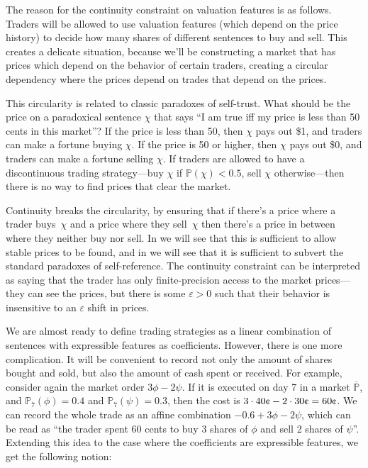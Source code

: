 \documentclass[authordate,onecolumn,noenvironments]{miri-tech-article}
\numberwithin{equation}{subsection}
\newcommand{\seq}[1]{{\overline{#1}}}
\newcommand{\BelState}{\mathbb{P}}
\newcommand{\pt}{\BelState}
\newcommand{\MP}{\seq{\pt}}
\begin{document}
The reason for the continuity constraint on valuation features is as follows. Traders will be allowed to use valuation features (which depend on the price history) to decide how many shares of different sentences to buy and sell. This creates a delicate situation, because we'll be constructing a market that has prices which depend on the behavior of certain traders, creating a circular dependency where the prices depend on trades that depend on the prices.

This circularity is related to classic paradoxes of self-trust. What should be the price on a paradoxical sentence $\chi$ that says ``I am true iff my price is less than 50 cents in this market''? If the price is less than 50\textcent, then $\chi$ pays out \$1, and traders can make a fortune buying $\chi$. If the price is 50\textcent{} or higher, then $\chi$ pays out \$0, and traders can make a fortune selling $\chi$. If traders are allowed to have a discontinuous trading strategy---buy $\chi$ if $\pt(\chi)<0.5$, sell $\chi$ otherwise---then there is no way to find prices that clear the market.

Continuity breaks the circularity, by ensuring that if there's a price where a trader buys~$\chi$ and a price where they sell~$\chi$ then there's a price in between where they neither buy nor sell. In  we will see that this is sufficient to allow stable prices to be found, and in  we will see that it is sufficient to subvert the standard paradoxes of self-reference. The continuity constraint can be interpreted as saying that the trader has only finite-precision access to the market prices---they can see the prices, but there is some $\varepsilon > 0$ such that their behavior is insensitive to an $\varepsilon$ shift in prices.

We are almost ready to define trading strategies as a linear combination of sentences with expressible features as coefficients. However, there is one more complication. It will be convenient to record not only the amount of shares bought and sold, but also the amount of cash spent or received. For example, consider again the market order $3\phi - 2\psi$. If it is executed on day 7 in a market $\MP$, and $\pt_7(\phi)=0.4$ and $\pt_7(\psi)=0.3$, then the cost is $3\cdot 40\text{\textcent} - 2\cdot 30\text{\textcent} = 60\text{\textcent}$. We can record the whole trade as an affine combination $-0.6 + 3\phi - 2\psi$, which can be read as ``the trader spent 60 cents to buy 3 shares of $\phi$ and sell 2 shares of $\psi$''. Extending this idea to the case where the coefficients are expressible features, we get the following notion:
\end{document}
